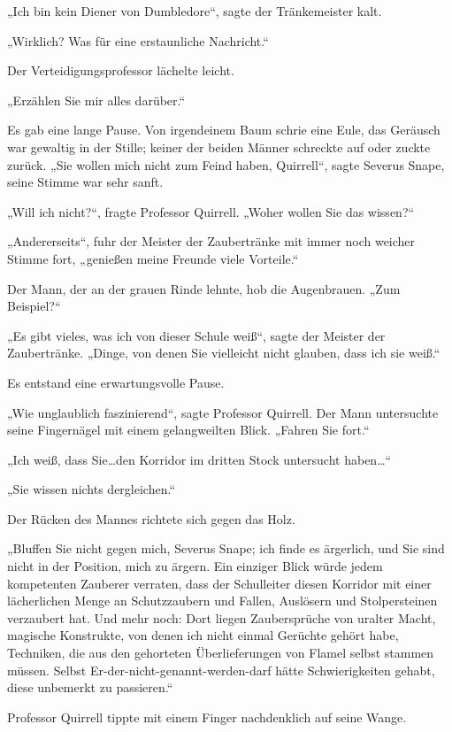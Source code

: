 {„Ich bin kein Diener von Dumbledore“, sagte der Tränkemeister kalt.

„Wirklich? Was für eine erstaunliche Nachricht.“

Der Verteidigungsprofessor lächelte leicht.

„Erzählen Sie mir alles darüber.“

Es gab eine lange Pause. Von irgendeinem Baum schrie eine Eule, das Geräusch war gewaltig in der Stille; keiner der beiden Männer schreckte auf oder zuckte zurück. „Sie wollen mich nicht zum Feind haben, Quirrell“, sagte Severus Snape, seine Stimme war sehr sanft.

„Will ich nicht?“, fragte Professor Quirrell. „Woher wollen Sie das wissen?“

„Andererseits“, fuhr der Meister der Zaubertränke mit immer noch weicher Stimme fort, „genießen meine Freunde viele Vorteile.“

Der Mann, der an der grauen Rinde lehnte, hob die Augenbrauen. „Zum Beispiel?“

„Es gibt vieles, was ich von dieser Schule weiß“, sagte der Meister der Zaubertränke. „Dinge, von denen Sie vielleicht nicht glauben, dass ich sie weiß.“

Es entstand eine erwartungsvolle Pause.

„Wie unglaublich faszinierend“, sagte Professor Quirrell. Der Mann untersuchte seine Fingernägel mit einem gelangweilten Blick. „Fahren Sie fort.“

„Ich weiß, dass Sie…den Korridor im dritten Stock untersucht haben…“

„Sie wissen nichts dergleichen.“

Der Rücken des Mannes richtete sich gegen das Holz.

„Bluffen Sie nicht gegen mich, Severus Snape; ich finde es ärgerlich, und Sie sind nicht in der Position, mich zu ärgern. Ein einziger Blick würde jedem kompetenten Zauberer verraten, dass der Schulleiter diesen Korridor mit einer lächerlichen Menge an Schutzzaubern und Fallen, Auslösern und Stolpersteinen verzaubert hat. Und mehr noch: Dort liegen Zaubersprüche von uralter Macht, magische Konstrukte, von denen ich nicht einmal Gerüchte gehört habe, Techniken, die aus den gehorteten Überlieferungen von Flamel selbst stammen müssen. Selbst Er-der-nicht-genannt-werden-darf hätte Schwierigkeiten gehabt, diese unbemerkt zu passieren.“

Professor Quirrell tippte mit einem Finger nachdenklich auf seine Wange.

}
